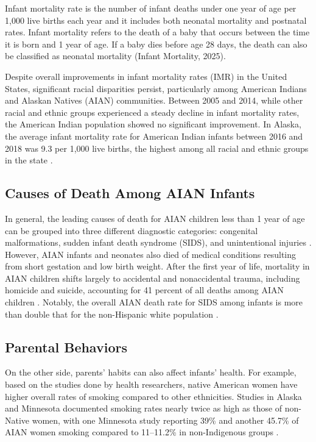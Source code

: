 \documentclass[12pt]{article}
\begin{document}
Infant mortality rate is the number of infant deaths under one year of
age per 1,000 live births each year and it includes both neonatal
mortality and postnatal rates. Infant mortality refers to the death of a
baby that occurs between the time it is born and 1 year of age. If a
baby dies before age 28 days, the death can also be classified as
neonatal mortality (Infant Mortality, 2025).

Despite overall improvements in infant mortality rates (IMR) in the
United States, significant racial disparities persist, particularly
among American Indians and Alaskan Natives (AIAN) communities. Between
2005 and 2014, while other racial and ethnic groups experienced a steady
decline in infant mortality rates, the American Indian population showed
no significant improvement. In Alaska, the average infant mortality rate
for American Indian infants between 2016 and 2018 was 9.3 per 1,000 live
births, the highest among all racial and ethnic groups in the state
\citep{jang2022}.

\subsection{Causes of Death Among AIAN Infants}

In general, the leading causes of death for AIAN children less than 1
year of age can be grouped into three different diagnostic categories:
congenital malformations, sudden infant death syndrome (SIDS), and
unintentional injuries \citep{wong2014}. However, AIAN infants and
neonates also died of medical conditions resulting from short gestation
and low birth weight. After the first
year of life, mortality in AIAN children shifts largely to accidental
and nonaccidental trauma, including homicide and suicide, accounting for
41 percent of all deaths among AIAN children \citep{wong2014}.
Notably, the overall AIAN death rate for SIDS among infants is more than
double that for the non-Hispanic white population \citep{macdorman2011}.

\subsection{Parental Behaviors}

On the other side, parents' habits can also affect infants' health. For
example, based on the studies done by health researchers, native
American women have higher overall rates of smoking compared to other
ethnicities. Studies in Alaska and Minnesota documented smoking rates
nearly twice as high as those of non-Native women, with one Minnesota
study reporting 39\% and another 45.7\% of AIAN women smoking compared to
11--11.2\% in non-Indigenous groups \citep{kaplan1997}.
\end{document}
